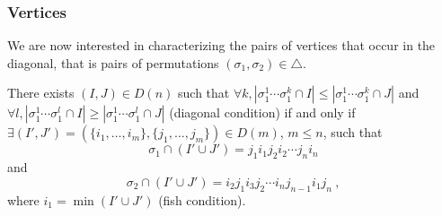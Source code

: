\subsubsection{Vertices}

We are now interested in characterizing the pairs of vertices that occur in the diagonal, that is pairs of permutations $(\sigma_1,\sigma_2) \in \triangle$. 

\begin{thm} There exists $(I,J) \in D(n)$ such that $\forall k, |\sigma_1^1\cdots\sigma_1^k \cap I| \leq |\sigma_1^1\cdots\sigma_1^k \cap J|$ and $\forall l, |\sigma_1^1\cdots\sigma_1^l \cap I| \geq |\sigma_1^1\cdots\sigma_1^l \cap J|$ (diagonal condition) if and only if $\exists (I',J')=(\{i_1,\ldots,i_m\},\{j_1,\ldots,j_m\}) \in D(m)$, $m\leq n$, such that \[\sigma_1 \cap (I'\cup J')=j_1 i_1 j_2 i_2 \cdots j_n i_n \] and \[ \sigma_2 \cap (I'\cup J') = i_2 j_1 i_3 j_2 \cdots i_n j_{n-1} i_1 j_n \ , \] where $i_1 = \min (I' \cup J')$ (fish condition). 
\end{thm}

